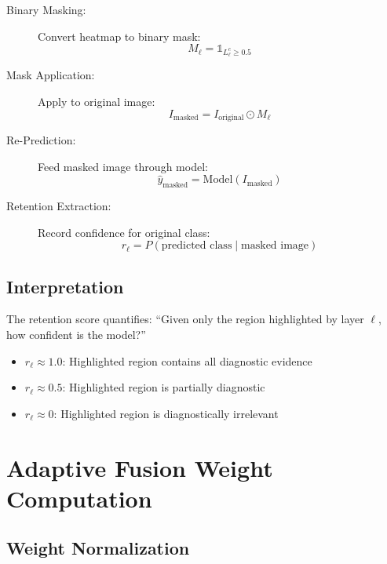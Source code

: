 \documentclass[12pt,a4paper,oneside]{book}
\begin{document}
\begin{description}
  \item[Binary Masking:] Convert heatmap to binary mask:
  \begin{equation}
    M_\ell = \mathbb{1}_{L_\ell^c \geq 0.5}
  \end{equation}
  
  \item[Mask Application:] Apply to original image:
  \begin{equation}
    I_{\text{masked}} = I_{\text{original}} \odot M_\ell
  \end{equation}
  
  \item[Re-Prediction:] Feed masked image through model:
  \begin{equation}
    \hat{y}_{\text{masked}} = \text{Model}(I_{\text{masked}})
  \end{equation}
  
  \item[Retention Extraction:] Record confidence for original class:
  \begin{equation}
    r_\ell = P(\text{predicted class} \mid \text{masked image})
  \end{equation}
\end{description}

\subsection{Interpretation}

The retention score quantifies: ``Given only the region highlighted by layer $\ell$, how confident is the model?''

\begin{itemize}
  \item $r_\ell \approx 1.0$: Highlighted region contains all diagnostic evidence
  \item $r_\ell \approx 0.5$: Highlighted region is partially diagnostic
  \item $r_\ell \approx 0$: Highlighted region is diagnostically irrelevant
\end{itemize}

\section{Adaptive Fusion Weight Computation}

\subsection{Weight Normalization}
\end{document}
